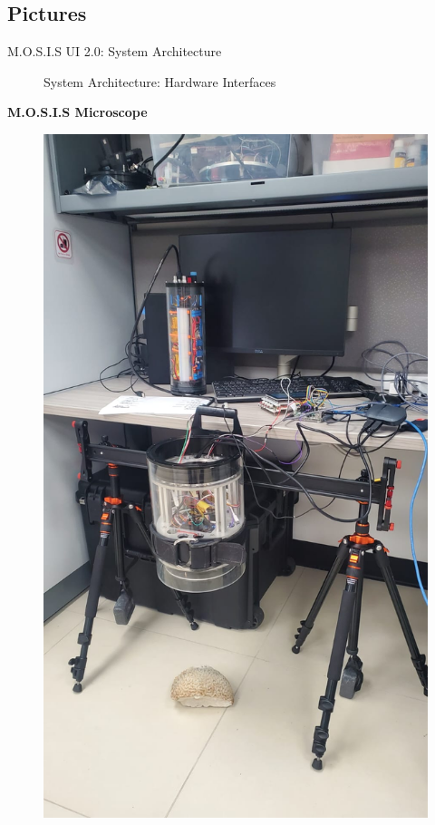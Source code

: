 \documentclass[17pt, aspectratio=169]{beamer}
\begin{document}
\subsection*{Pictures}
\begin{frame}{M.O.S.I.S UI 2.0: System Architecture}
	\begin{figure}
		\caption{System Architecture: Hardware Interfaces}
	\end{figure}
\end{frame}
\begin{frame}
	\textbf{M.O.S.I.S Microscope}
	\begin{figure}
		\includegraphics[width=\textwidth, height=\textheight, keepaspectratio]{./Figures/MOSIS.jpg}

\end{figure}
\end{frame}
\end{document}
